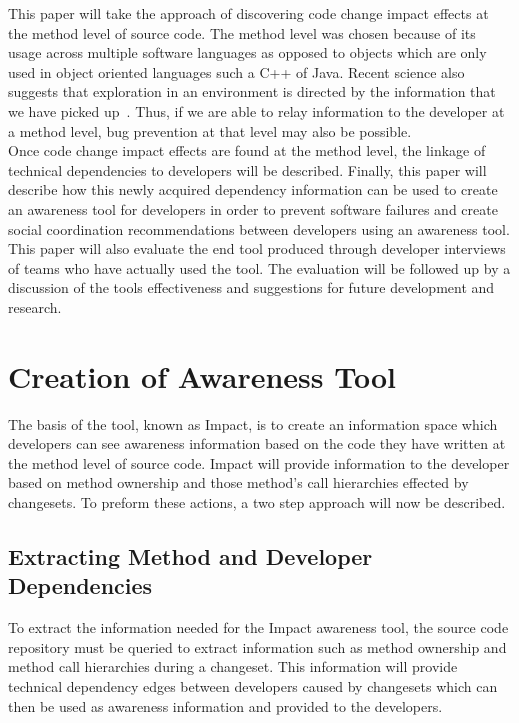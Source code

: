 \documentclass[conference]{IEEEtran}
\begin{document}
This paper will take the approach of discovering code change impact effects at the method
level of source code. The method level was chosen because of its usage across multiple
software languages as opposed to objects which are only used in object oriented languages
such a C++ of Java.  Recent science also suggests that exploration in an environment
is directed by the information that we have picked up~\cite{Neisser:1974:USE}. Thus, if we are able to relay
information to the developer at a method level, bug prevention at that level may
also be possible.\\

Once code change impact effects are found at the method level, the 
linkage of technical dependencies to developers will be described. Finally, this paper will
describe how this newly acquired dependency information can be used to create an awareness
tool for developers in order to prevent software failures and create social coordination
recommendations between developers using an awareness tool.\\

This paper will also evaluate the end tool produced through developer interviews of teams
who have actually used the tool.  The evaluation will be followed up by a discussion of
the tools effectiveness and suggestions for future development and research.\\


\section{Creation of Awareness Tool}

The basis of the tool, known as Impact, is to create an information space which developers can see awareness information
based on the code they have written at the method level of source code. Impact will provide information to the
developer based on method ownership and those method's call hierarchies effected by changesets.  To preform
these actions, a two step approach will now be described. \\

\subsection{Extracting Method and Developer Dependencies}
To extract the information needed for the Impact awareness tool, the source code repository must be queried to
extract information such as method ownership and method call hierarchies during a changeset. This information
will provide technical dependency edges between developers caused by changesets which can then be used as
awareness information and provided to the developers. \\
\end{document}
